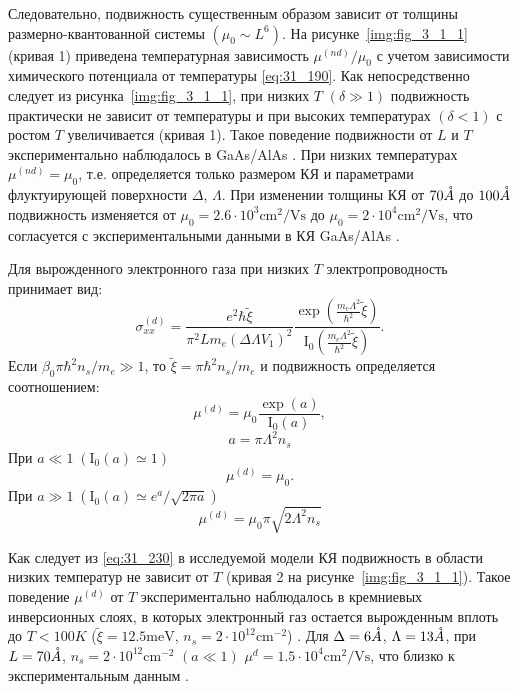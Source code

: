 Следовательно, подвижность существенным образом зависит от толщины размерно-квантованной системы $(\mu_0 \sim L^6 )$. На рисунке~\ref{img:fig_3_1_1} (кривая 1) приведена температурная зависимость $\mu ^{(nd)} /\mu_0 $ с учетом зависимости химического потенциала от температуры \eqref{eq:31_190}. Как непосредственно следует из рисунка~\ref{img:fig_3_1_1}, при низких $T$ $(\delta \gg 1)$ подвижность практически не зависит от температуры и при высоких температурах $(\delta <1)$ с ростом $T$ увеличивается (кривая 1). Такое поведение подвижности от $L$ и $T$ экспериментально наблюдалось в GaAs/AlAs \cite{Sakaki1987}. При низких температурах $\mu ^{(nd)} =\mu_0 $, т.е. определяется только размером КЯ и параметрами флуктуирующей поверхности $\Delta $, $\Lambda $. При изменении толщины КЯ от $70 \AA$ до $100 \AA$ подвижность изменяется от $\mu_0 =2.6\cdot 10^3 \text{cm}^2 / \text{Vs}$ до $\mu_0 =2\cdot 10^4 \text{cm}^2 /\text{Vs}$, что согласуется с экспериментальными данными в КЯ GaAs/AlAs \cite{Sakaki1987}.

Для вырожденного электронного газа при низких $T$ электропроводность принимает вид:
\begin{equation} \label{eq:31_210}
\sigma _{xx}^{(d)} =\frac{e^2 \hbar \tilde{\xi }}{\pi^2 L m_e \left(\Delta \Lambda V_{1} \right)^2 } \frac{\exp{\left(\frac{m_e \Lambda^2 }{\hbar^2 } \tilde{\xi }\right)}}{\mathrm{I}_0 \left(\frac{m_e \Lambda^2 }{\hbar^2 } \tilde{\xi }\right)}.
\end{equation}
Если $\beta_0 \pi \hbar^2 n_s /m_e \gg 1$, то $\tilde{\xi }=\pi \hbar^2 n_s /m_e$ и подвижность определяется соотношением:
\begin{equation} \label{eq:31_220}
\mu^{(d)} =\mu _{0} \frac{\exp (a)}{\mathrm{I}_0 (a)},
\end{equation}
\[
a=\pi \Lambda ^{2} n_{s}
\]
При $a \ll 1 \; (\mathrm{I}_0 (a) \simeq 1)$ 
\begin{equation} \label{eq:31_230}     
\mu ^{(d)} =\mu _{0}.
\end{equation}
При $a \gg 1  \; (\mathrm{I}_0 (a) \simeq e^a / \sqrt{2\pi a})$
\begin{equation} \label{eq:31_240}  
\mu ^{(d)} =\mu _{0} \pi \sqrt{2\Lambda ^{2} n_{s} }
\end{equation}

Как следует из \eqref{eq:31_230} в исследуемой модели КЯ подвижность в области низких температур не зависит от $T$ (кривая 2 на рисунке~\ref{img:fig_3_1_1}). Такое поведение $\mu^{(d)} $ от $T$ экспериментально наблюдалось в кремниевых инверсионных слоях, в которых электронный газ остается вырожденным вплоть до $T<100 K$ ($\tilde{\xi }=12.5 \text{meV}$, $n_{s} =2\cdot 10^{12} \text{cm}^{-2} $) \cite{Stern1980}. Для $\Delta =6\AA$, $\Lambda =13 \AA$, при $L=70 \AA$, $n_{s} =2\cdot 10^{12}  \text{cm}^{-2} $ $(a \ll 1)$ $\mu^d =1.5 \cdot 10^4 \text{cm}^2 /\text{Vs}$, что близко к экспериментальным данным \cite{Stern1980}.

